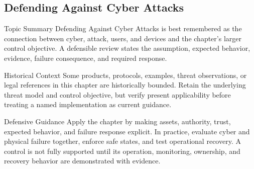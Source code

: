 \documentclass[11pt,letterpaper]{article}
\begin{document}
\subsection*{Defending Against Cyber Attacks}
\begin{CornellNotesTable}
\end{CornellNotesTable}
\begin{CornellSummaryBox}{Topic Summary}
Defending Against Cyber Attacks is best remembered as the connection between cyber, attack, users, and devices and the chapter's larger control objective. A defensible review states the assumption, expected behavior, evidence, failure consequence, and required response.
\end{CornellSummaryBox}
\begin{CornellWarningBox}{Historical Context}
Some products, protocols, examples, threat observations, or legal references in this chapter are historically bounded. Retain the underlying threat model and control objective, but verify present applicability before treating a named implementation as current guidance.
\end{CornellWarningBox}
\begin{CornellOverviewBox}{Defensive Guidance}
Apply the chapter by making assets, authority, trust, expected behavior, and failure response explicit. In practice, evaluate cyber and physical failure together, enforce safe states, and test operational recovery. A control is not fully supported until its operation, monitoring, ownership, and recovery behavior are demonstrated with evidence.
\end{CornellOverviewBox}
\end{document}
